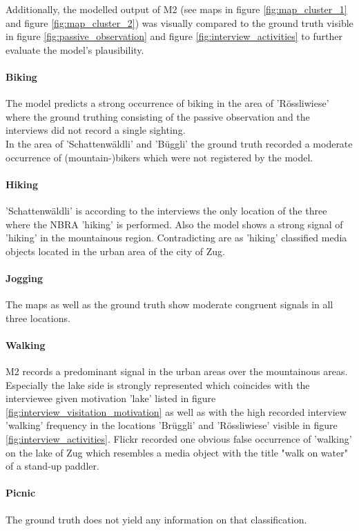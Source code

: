 Additionally, the modelled output of M2 (see maps in figure \ref{fig:map_cluster_1} and figure \ref{fig:map_cluster_2}) was visually compared to the ground truth visible in figure \ref{fig:passive_observation} and figure \ref{fig:interview_activities} to further evaluate the model's plausibility.

\paragraph*{Biking}
The model predicts a strong occurrence of biking in the area of 'R\"ossliwiese' where the ground truthing consisting of the passive observation and the interviews did not record a single sighting.\\
In the area of 'Schattenw\"aldli' and 'B\"uggli' the ground truth recorded a moderate occurrence of (mountain-)bikers which were not registered by the model. 

\paragraph*{Hiking}
'Schattenw\"aldli' is according to the interviews the only location of the three where the NBRA 'hiking' is performed. Also the model shows a strong signal of 'hiking' in the mountainous region. Contradicting are as 'hiking' classified media objects located in the urban area of the city of Zug.

\paragraph*{Jogging}
The maps as well as the ground truth show moderate congruent signals in all three locations.

\paragraph*{Walking}
M2 records a predominant signal in the urban areas over the mountainous areas. Especially the lake side is strongly represented which coincides with the interviewee given motivation 'lake' listed in figure \ref{fig:interview_visitation_motivation} as well as with the high recorded interview 'walking' frequency in the locations 'Br\"uggli' and 'R\"ossliwiese' visible in figure \ref{fig:interview_activities}. Flickr recorded one obvious false occurrence of 'walking' on the lake of Zug which resembles a media object with the title "walk on water" of a stand-up paddler.

\paragraph*{Picnic}
The ground truth does not yield any information on that classification.

